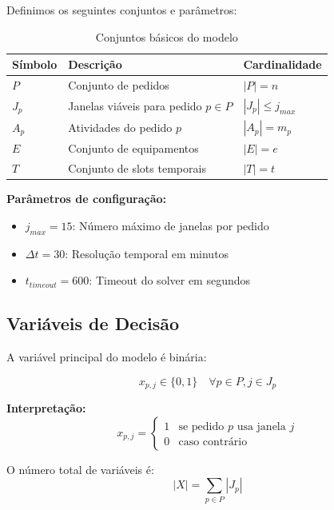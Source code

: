 \documentclass[12pt,a4paper]{article}
\theoremstyle{definition}
\begin{document}
Definimos os seguintes conjuntos e parâmetros:

\begin{table}[H]
\centering
\begin{tabular}{@{}lll@{}}
\toprule
\textbf{Símbolo} & \textbf{Descrição} & \textbf{Cardinalidade} \\
\midrule
$P$ & Conjunto de pedidos & $|P| = n$ \\
$J_p$ & Janelas viáveis para pedido $p \in P$ & $|J_p| \leq j_{max}$ \\
$A_p$ & Atividades do pedido $p$ & $|A_p| = m_p$ \\
$E$ & Conjunto de equipamentos & $|E| = e$ \\
$T$ & Conjunto de slots temporais & $|T| = t$ \\
\bottomrule
\end{tabular}
\caption{Conjuntos básicos do modelo}
\label{tab:conjuntos}
\end{table}

\textbf{Parâmetros de configuração:}
\begin{itemize}
    \item $j_{max} = 15$: Número máximo de janelas por pedido
    \item $\Delta t = 30$: Resolução temporal em minutos
    \item $t_{timeout} = 600$: Timeout do solver em segundos
\end{itemize}

\subsection{Variáveis de Decisão}

A variável principal do modelo é binária:

\begin{equation}
x_{p,j} \in \{0, 1\} \quad \forall p \in P, j \in J_p
\end{equation}

\textbf{Interpretação:}
\begin{equation}
x_{p,j} = \begin{cases}
1 & \text{se pedido } p \text{ usa janela } j \\
0 & \text{caso contrário}
\end{cases}
\end{equation}

O número total de variáveis é:
\begin{equation}
|X| = \sum_{p \in P} |J_p|
\end{equation}
\end{document}
